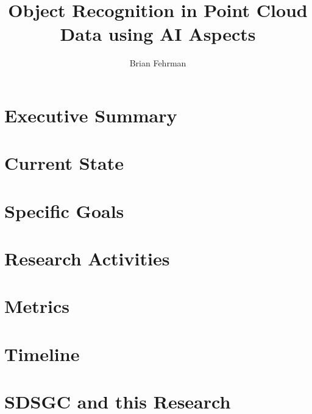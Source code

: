\documentclass[10pt,letterpaper]{article}
\author{Brian Fehrman}
\title{Object Recognition in Point Cloud Data using AI Aspects}
\begin{document}
\maketitle

\section*{Executive Summary}


\section*{Current State}


\section*{Specific Goals}


\section*{Research Activities}


\section*{Metrics}


\section*{Timeline}


\section*{SDSGC and this Research}


\newpage


\end{document}
